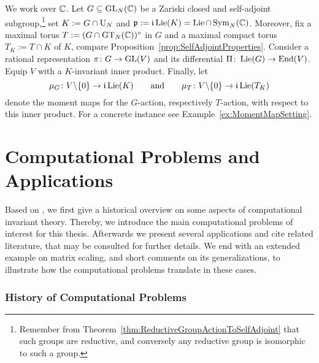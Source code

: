 \begin{setting} \label{set:AssumptionsPart2}
	We work over $\mathbb C$. Let $G \subseteq \operatorname{GL}_N(\mathbb C)$ be a Zariski closed and self-adjoint subgroup,\footnote{Remember from Theorem~\ref{thm:ReductiveGroupActionToSelfAdjoint} that such groups are reductive, and conversely any reductive group is isomorphic to such a group.}
	set $K:= G \cap \operatorname{U}_N$ and $\mathfrak{p} := \mathfrak{i} \operatorname{Lie}(K) = \operatorname{Lie} \cap \operatorname{Sym}_N(\mathbb C)$.
	Moreover, fix a maximal torus $T := (G \cap\operatorname{GT}_N(\mathbb C))^\circ$ in $G$ and a maximal compact torus $T_K := T \cap K$ of $K$, compare Proposition~\ref{prop:SelfAdjointProperties}.
	Consider a rational representation $\pi \colon G \to \operatorname{GL}(V)$ and its differential $\Pi \colon \operatorname{Lie}(G) \to \operatorname{End}(V)$. Equip $V$ with a $K$-invariant inner product. Finally, let
		\[ \mu_G \colon V\backslash\{0\} \to \mathfrak{i} \operatorname{Lie}(K) \qquad \text{and} \qquad \mu_T \colon V\backslash\{0\} \to \mathfrak{i} \operatorname{Lie}(T_K) \]
	denote the moment maps for the $G$-action, respectively $T$-action, with respect to this inner product.
	For a concrete instance see Example~\ref{ex:MomentMapSetting}.
	\hfill{}
\end{setting}



\section{Computational Problems and Applications} \label{sec:CompProblems}

Based on \cite{dieudonneCarrell1970, SturmfelsBookInvariant, DerksenKemperBook}, we first give a historical overview on some aspects of computational invariant theory. Thereby, we introduce the main computational problems of interest for this thesis. Afterwards we present several applications and cite related literature, that may be consulted for further details. We end with an extended example on matrix scaling, and short comments on its generalizations, to illustrate how the computational problems translate in these cases.


\subsubsection*{History of Computational Problems}


